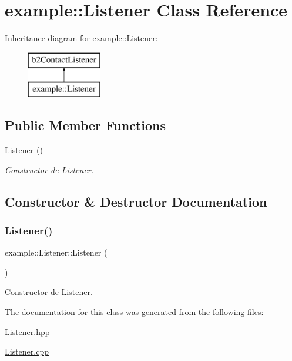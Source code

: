 \hypertarget{classexample_1_1_listener}{}\section{example\+::Listener Class Reference}
\label{classexample_1_1_listener}
Inheritance diagram for example\+::Listener\+:\begin{figure}[H]
\begin{center}
\leavevmode
\includegraphics[height=2.000000cm]{classexample_1_1_listener}
\end{center}
\end{figure}
\subsection*{Public Member Functions}
\begin{DoxyCompactItemize}
\item 
\mbox{\hyperlink{classexample_1_1_listener_ae83342edcf77dd53dfbee7e148880e36}{Listener}} ()
\begin{DoxyCompactList}\small\item\em Constructor de \mbox{\hyperlink{classexample_1_1_listener}{Listener}}. \end{DoxyCompactList}\end{DoxyCompactItemize}


\subsection{Constructor \& Destructor Documentation}
\mbox{\label{classexample_1_1_listener_ae83342edcf77dd53dfbee7e148880e36}} 
\subsubsection{\texorpdfstring{Listener()}{Listener()}}
{\footnotesize\ttfamily example\+::\+Listener\+::\+Listener (\begin{DoxyParamCaption}{ }\end{DoxyParamCaption})\hspace{0.3cm}{\ttfamily [inline]}}



Constructor de \mbox{\hyperlink{classexample_1_1_listener}{Listener}}. 



The documentation for this class was generated from the following files\+:\begin{DoxyCompactItemize}
\item 
\mbox{\hyperlink{_listener_8hpp}{Listener.\+hpp}}\item 
\mbox{\hyperlink{_listener_8cpp}{Listener.\+cpp}}\end{DoxyCompactItemize}
